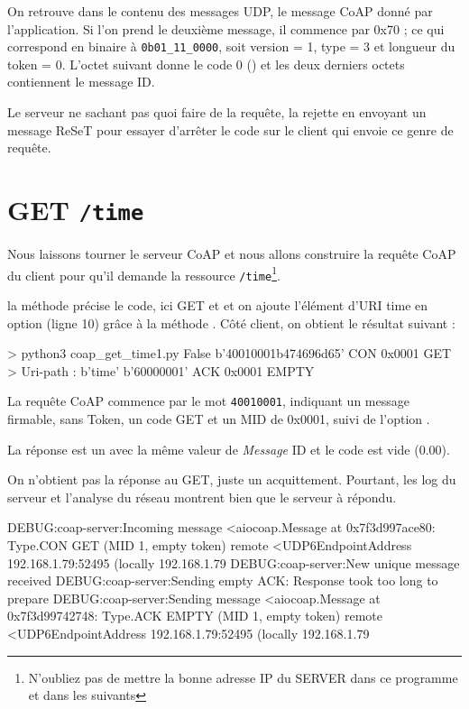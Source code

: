 On retrouve dans le contenu des messages UDP, le message CoAP donné par l’application. Si l’on prend le deuxième message, il commence par 0x70 ; ce qui correspond en binaire à \texttt{0b01\_11\_0000}, soit version = 1, type = 3 et longueur du token = 0.
L’octet suivant donne le code 0 () et les deux derniers octets contiennent le message ID. 

Le serveur ne sachant pas quoi faire de la requête, la rejette en envoyant un message ReSeT pour essayer d’arrêter le code sur le client qui envoie ce genre de requête.

\section {GET \texttt{/time}}

Nous laissons tourner le serveur CoAP et nous allons construire la requête CoAP du client pour qu'il demande la ressource \texttt{/time}\footnote{N'oubliez pas de mettre la bonne adresse IP du SERVER dans ce programme et dans les suivants}.


la méthode  précise le code, ici GET et et on ajoute l'élément d'URI time en option (ligne 10) grâce à la méthode . Côté client, on obtient le résultat suivant :

\begin{termc}[backgroundcolor=\color{gray!10}, basicstyle=\ttfamily\small, escapechar=@] 
> python3 coap_get_time1.py
False
b'40010001b474696d65'
CON  0x0001 GET   
> Uri-path : b'time'
b'60000001'
ACK  0x0001 EMPTY 
\end{termc}

La requête CoAP commence par le mot \texttt{40010001}, indiquant un message firmable, sans Token, un code GET et un MID de 0x0001, suivi de l'option .

         \vspace{1em}

La réponse est un  avec la même valeur de  \textit{Message} ID et le code est vide (0.00).

         \vspace{1em}

On n'obtient pas la réponse au GET, juste un acquittement. Pourtant, les log du serveur et l'analyse du réseau montrent bien que le serveur à répondu.

\begin{termc}[backgroundcolor=\color{palerod}, basicstyle=\ttfamily\tiny, escapechar=@] 
DEBUG:coap-server:Incoming message <aiocoap.Message at 0x7f3d997ace80: Type.CON GET (MID 1, empty token) remote 
<UDP6EndpointAddress 192.168.1.79:52495 (locally 192.168.1.79%
DEBUG:coap-server:New unique message received
DEBUG:coap-server:Sending empty ACK: Response took too long to prepare
DEBUG:coap-server:Sending message <aiocoap.Message at 0x7f3d99742748: Type.ACK EMPTY (MID 1, empty token) remote 
<UDP6EndpointAddress 192.168.1.79:52495 (locally 192.168.1.79%
\end{termc}

